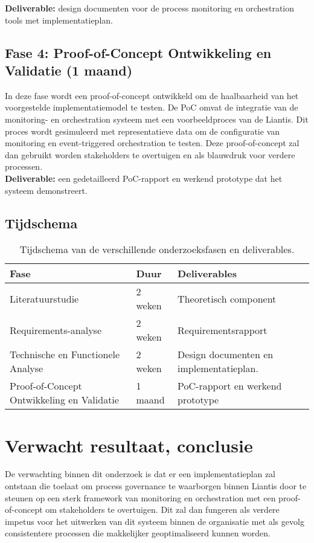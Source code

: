 \textbf{Deliverable:} design documenten voor de process monitoring en orchestration tools met implementatieplan.

\subsection{Fase 4: Proof-of-Concept Ontwikkeling en Validatie (1 maand)}

In deze fase wordt een proof-of-concept ontwikkeld om de haalbaarheid van het voorgestelde implementatiemodel te testen. De PoC omvat de integratie van de monitoring- en orchestration systeem met een voorbeeldproces van de Liantis. Dit proces wordt gesimuleerd met representatieve data om de configuratie van monitoring en event-triggered orchestration te testen. Deze proof-of-concept zal dan gebruikt worden stakeholders te overtuigen en als blauwdruk voor verdere processen. \\

\textbf{Deliverable:} een gedetailleerd PoC-rapport en werkend prototype dat het systeem demonstreert.

\subsection{Tijdschema}

\begin{table}[h!]
\centering
\begin{tabular}{|p{6cm}|p{2.5cm}|p{5cm}|}
\hline
\textbf{Fase} & \textbf{Duur} & \textbf{Deliverables} \\
\hline
Literatuurstudie & 2 weken & Theoretisch component \\
\hline
Requirements-analyse & 2 weken & Requirementsrapport \\
\hline
Technische en Functionele Analyse & 2 weken & Design documenten en implementatieplan. \\
\hline
Proof-of-Concept Ontwikkeling en Validatie & 1 maand & PoC-rapport en werkend prototype \\
\hline
\end{tabular}
\caption{Tijdschema van de verschillende onderzoeksfasen en deliverables.}
\end{table}

\section{Verwacht resultaat, conclusie}%
\label{sec:verwachte_resultaten}
De verwachting binnen dit onderzoek is dat er een implementatieplan zal ontstaan die toelaat om process governance te waarborgen binnen Liantis door te steunen op een sterk framework van monitoring en orchestration met een proof-of-concept om stakeholders te overtuigen. Dit zal dan fungeren als verdere impetus voor het uitwerken van dit systeem binnen de organisatie met als gevolg consistentere processen die makkelijker geoptimaliseerd kunnen worden.

